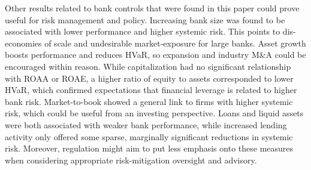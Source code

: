\documentclass[10pt]{article} %
\begin{document}
Other results related to bank controls that were found in this paper could prove useful for risk management and policy. Increasing bank size was found to be associated with lower performance and higher systemic risk. This points to dis-economies of scale and undesirable market-exposure for large banks. Asset growth boosts performance and reduces HVaR, so expansion and industry M\&A could be encouraged within reason. While capitalization had no significant relationship with ROAA or ROAE, a higher ratio of equity to assets corresponded to lower HVaR, which confirmed expectations that financial leverage is related to higher bank risk. Market-to-book showed a general link to firms with higher systemic risk, which could be useful from an investing perspective. Loans and liquid assets were both associated with weaker bank performance, while increased lending activity only offered some sparse, marginally significant reductions in systemic risk. Moreover, regulation might aim to put less emphasis onto these measures when considering appropriate risk-mitigation oversight and advisory. 
\end{document}
